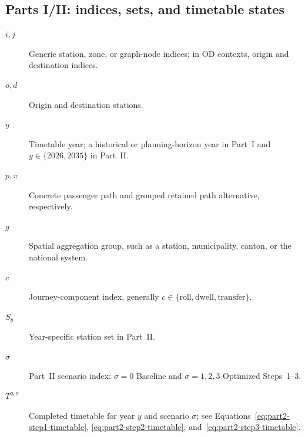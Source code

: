 \documentclass[preprint,12pt]{elsarticle}
\begin{document}
\subsection*{Parts I/II: indices, sets, and timetable states}
\begin{description}
    \item[$i,j$] Generic station, zone, or graph-node indices; in OD contexts, origin and destination indices.
    \item[$o,d$] Origin and destination stations.
    \item[$y$] Timetable year; a historical or planning-horizon year in Part~I and \(y\in\{2026,2035\}\) in Part~II.
    \item[$p,\pi$] Concrete passenger path and grouped retained path alternative, respectively.
    \item[$g$] Spatial aggregation group, such as a station, municipality, canton, or the national system.
    \item[$c$] Journey-component index, generally \(c\in\{\mathrm{roll},\mathrm{dwell},\mathrm{transfer}\}\).
    \item[$S_y$] Year-specific station set in Part~II.
    \item[$\sigma$] Part~II scenario index: \(\sigma=0\) Baseline and \(\sigma=1,2,3\) Optimized Steps~1--3.
    \item[$T^{y,\sigma}$] Completed timetable for year \(y\) and scenario \(\sigma\); see Equations~\eqref{eq:part2-step1-timetable}, \eqref{eq:part2-step2-timetable}, and~\eqref{eq:part2-step3-timetable}.
\end{description}
\end{document}
